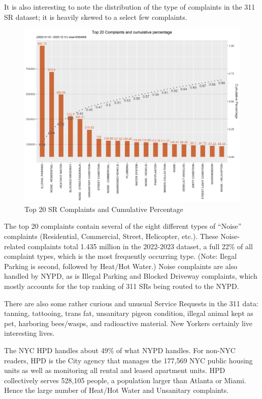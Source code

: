 \documentclass[12pt, titlepage]{article}
\begin{document}
It is also interesting to note the distribution of the type of complaints in the 311 SR dataset; it is heavily skewed to  a select few complaints.

\begin{figure}[htbp]
  \centering
	  \includegraphics[width=\textwidth]{SRs_by_Complaint_Type.png}
	  \caption{Top 20 SR Complaints and Cumulative Percentage}
	  \label{fig:SR_complaints}
\end{figure}

The top 20 complaints contain several of the eight different types of ``Noise'' complaints (Residential, Commercial, Street, Helicopter, etc.). These Noise-related
complaints total 1.435 million in the 2022-2023 dataset, a full 22\% of all complaint types, which is the most frequently occurring type. (Note: Ilegal Parking is 
second, followed by Heat/Hot Water.) Noise complaints are also handled by NYPD, as is Illegal Parking and Blocked Driveway complaints, which mostly
accounts for the top ranking of 311 SRs being routed to the NYPD.

There are also some rather curious and unusual Service Requests in the 311 data: 
tanning, tattooing, trans fat, unsanitary pigeon condition, illegal animal kept as pet, harboring bees/wasps, and radioactive material. 
New Yorkers certainly live interesting lives. 

The NYC HPD handles about 49\% of what NYPD handles. For  non-NYC readers, 
HPD is the City agency that manages the  177,569 NYC public housing units as well as monitoring all rental and leased apartment units. HPD collectively
serves 528,105 people, a population larger than Atlanta or Miami. Hence the large number of Heat/Hot Water and Unsanitary complaints. 
\end{document}
